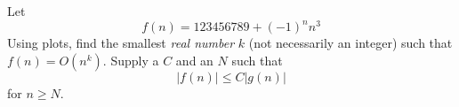 Let
\[
f(n) = 123456789 + (-1)^n n^3
\]
Using plots, 
find the smallest \textit{real number} $k$ (not necessarily an integer) 
such that $f(n) = O(n^k)$.
Supply a $C$ and an $N$ such that 
\[
|f(n)| \leq C |g(n)|
\]
for $n \geq N$.
